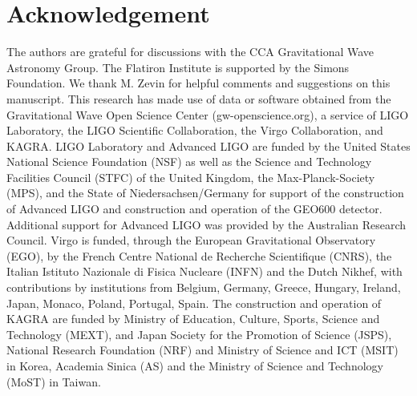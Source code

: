 \documentclass[twocolumn]{aastex631}
\begin{document}
\section{Acknowledgement}
The authors are grateful for discussions with the CCA Gravitational Wave Astronomy Group.
The Flatiron Institute is supported by the Simons Foundation.  We thank M. Zevin for helpful comments and suggestions on this manuscript.
This research has made use of data or software obtained from the Gravitational Wave Open Science Center (gw-openscience.org),
a service of LIGO Laboratory, the LIGO Scientific Collaboration, the Virgo Collaboration, and KAGRA.
LIGO Laboratory and Advanced LIGO are funded by the United States National Science Foundation (NSF) as well as
the Science and Technology Facilities Council (STFC) of the United Kingdom, the Max-Planck-Society (MPS),
and the State of Niedersachsen/Germany for support of the construction of Advanced LIGO and construction and operation of the GEO600 detector.
Additional support for Advanced LIGO was provided by the Australian Research Council. Virgo is funded, through the European Gravitational Observatory (EGO),
by the French Centre National de Recherche Scientifique (CNRS), the Italian Istituto Nazionale di Fisica Nucleare (INFN) and the Dutch Nikhef,
with contributions by institutions from Belgium, Germany, Greece, Hungary, Ireland, Japan, Monaco, Poland, Portugal, Spain.
The construction and operation of KAGRA are funded by Ministry of Education, Culture, Sports, Science and Technology (MEXT),
and Japan Society for the Promotion of Science (JSPS), National Research Foundation (NRF) and Ministry of Science and ICT (MSIT) in Korea,
Academia Sinica (AS) and the Ministry of Science and Technology (MoST) in Taiwan.



\end{document}
